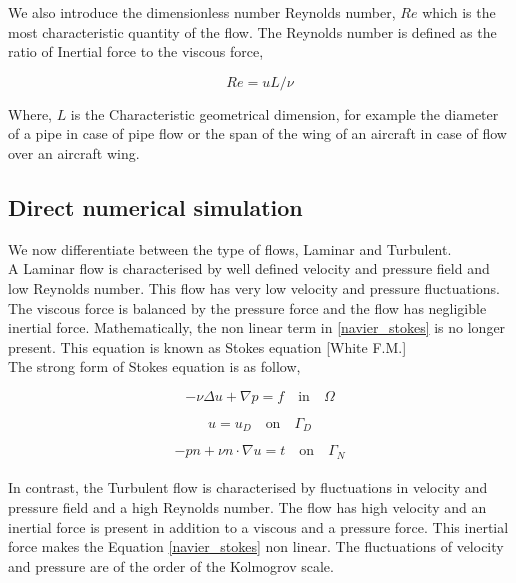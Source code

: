 \documentclass[a4paper,12pt]{book}
\begin{document}
We also introduce the dimensionless number Reynolds number, $Re$ which is the most characteristic quantity of the flow. The Reynolds number is defined as the ratio of Inertial force to the viscous force,

\begin{equation} \label{reynolds_number}
Re =  u L / \nu
\end{equation}

Where, $L$ is the Characteristic geometrical dimension, for example the diameter of a pipe in case of pipe flow or the span of the wing of an aircraft in case of flow over an aircraft wing.\\

\subsection[DNS]{Direct numerical simulation} 

We now differentiate between the type of flows, Laminar and Turbulent.\\
A Laminar flow is characterised by well defined velocity and pressure field and low Reynolds number. This flow has very low velocity and pressure fluctuations. The viscous force is balanced by the pressure force and the flow has negligible inertial force. Mathematically, the non linear term in \eqref{navier_stokes} is no longer present. This equation is known as Stokes equation [White F.M.\cite{white}]\\

The strong form of Stokes equation is as follow,

\begin{equation} \label{stokes_strong_form}
-\nu \Delta u + \nabla p = f \quad \textrm{in} \quad \Omega
\end{equation}

\begin{equation} \label{dirichlet condition stokes}
u = u_D \quad \textrm{on} \quad \Gamma_D
\end{equation}

\begin{equation} \label{neumann condition stokes}
-pn + \nu n \cdot \nabla u = t \quad \textrm{on} \quad \Gamma_N
\end{equation}
\\
In contrast, the Turbulent flow is characterised by fluctuations in velocity and pressure field and a high Reynolds number. The flow has high velocity and an inertial force is present in addition to a viscous and a pressure force. This inertial force makes the Equation \eqref{navier_stokes} non linear. The fluctuations of velocity and pressure are of the order of the Kolmogrov scale.\\
\end{document}
